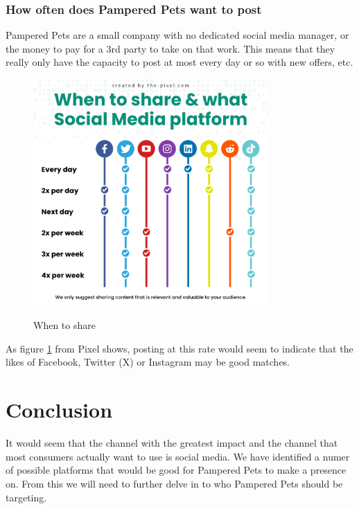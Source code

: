 \documentclass{article}
\begin{document}
\subsubsection{How often does Pampered Pets want to post}
Pampered Pets are a small company with no dedicated social media manager, or the money to pay for a 3rd party to take on that work. 
This means that they really only have the capacity to post at most every day or so with new offers, etc. 
\begin{figure}[ht]
    \caption{When to share}
    \centering
    \includegraphics[width=0.8\textwidth]{sharing-on-social-media-channels}
    \label{fig:days}
    \end{figure}
    \FloatBarrier
 As figure \ref{fig:days} from Pixel \cite{pixel} shows, posting at this rate would seem to indicate that the likes of Facebook, Twitter (X) or Instagram may be good matches.

 \section{Conclusion}
 It would seem that the channel with the greatest impact and the channel that most consumers actually want to use is social media. We have identified a numer of possible platforms that would be good for Pampered Pets to make a presence on. From this we will need to further delve in to who Pampered Pets should be targeting.


\end{document}
